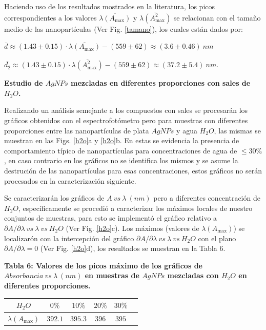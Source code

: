 Haciendo uso de los resultados mostrados en la literatura, los picos correspondientes a los valores $\overline{ \lambda ( A_{\max} )}$ y $\overline{ \lambda ( A_{\max}^2)}$ se relacionan con el tamaño medio de las nanopartículas (Ver Fig. \ref{tamano}), los cuales están dados por:

$\overline{d} \approx  (1.43\pm 0.15)\cdot  \overline{ \lambda ( A_{\max} )} -(559\pm 62)\approx (3.6\pm 0.46)~n m$ 

$\overline{d_2} \approx  (1.43\pm 0.15)\cdot  \overline{ \lambda ( A_{\max}^2)} -(559\pm 62)\approx (37.2\pm 5.4)~n m$.

\textbf{Estudio de $AgNPs$ mezcladas en diferentes proporciones con sales de $H_2O$.}

Realizando un análisis semejante a los compuestos con sales se procesarán los gráficos obtenidos con el espectrofotómetro pero para muestras con diferentes proporciones entre las nanopartículas de plata $AgNPs$ y agua $H_2O$, las mismas se muestran en las Figs. \ref{h2o}a y \ref{h2o}b. En estas se evidencia la presencia de comportamiento típico de nanopartículas para concentraciones de agua de $\leq 30\%$, en caso contrario en los gráficos no se identifica los mismos y se asume la destrución de las nanopartículas para esas concentraciones, estos gráficos no serán procesados en la caracterización siguiente.

Se caracterizarán los gráficos de $A~vs~\lambda ~(nm)$ pero a diferentes concentración de $H_2O$, específicamente se procedió a caracterizar los máximos locales de nuestro conjuntos de muestras, para esto se implementó el gráfico relativo a $\partial A/\partial \lambda~vs~\lambda~vs~H_2O$ (Ver Fig. \ref{h2o}c). Los máximos (valores de $\lambda(A_{\max})$) se localizarón con la intercepción del gráfico $\partial A/\partial \lambda~vs~\lambda~vs~H_2O$ con el plano $\partial A/\partial \lambda =0$ (Ver Fig. \ref{h2o}d), los resultados se muestran en la Tabla 6.

\textbf{Tabla 6: Valores de los picos máximo de los gráficos de $Absorbancia~vs~\lambda~(nm)$ en muestras de $AgNPs$ mezcladas con $H_2O$ en diferentes proporciones.}

\begin{tabular}{|c|c|c|c|c|c|}
    \hline
    $H_2O$ &  $0\%$ & $10\%$ & $20\%$ & $30\%$ \\
    \hline
    $\lambda(A_{\max})$ & $392.1$ & $395.3$ & $396$ & $395$\\
    \hline
\end{tabular}

